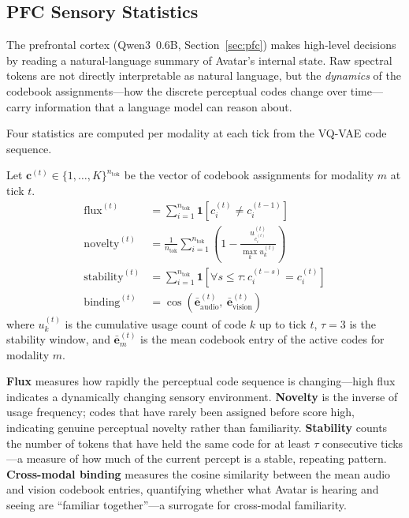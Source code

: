 \subsection{PFC Sensory Statistics}
\label{sec:pfc_stats}

The prefrontal cortex (Qwen3~0.6B, Section~\ref{sec:pfc}) makes high-level decisions
by reading a natural-language summary of Avatar's internal state.
Raw spectral tokens are not directly interpretable as natural language, but the
\emph{dynamics} of the codebook assignments---how the discrete perceptual codes
change over time---carry information that a language model can reason about.

Four statistics are computed per modality at each tick from the VQ-VAE code sequence.

\begin{definition}
Let $\mathbf{c}^{(t)} \in \{1, \ldots, K\}^{n_{\mathrm{tok}}}$ be the vector of
codebook assignments for modality $m$ at tick $t$.
\begin{align}
\mathrm{flux}^{(t)} &= \sum_{i=1}^{n_{\mathrm{tok}}} \mathbf{1}\!\left[c_i^{(t)} \neq c_i^{(t-1)}\right] \label{eq:flux} \\
\mathrm{novelty}^{(t)} &= \frac{1}{n_{\mathrm{tok}}} \sum_{i=1}^{n_{\mathrm{tok}}} \left(1 - \frac{u_{c_i^{(t)}}^{(t)}}{\max_k u_k^{(t)}}\right) \label{eq:novelty} \\
\mathrm{stability}^{(t)} &= \sum_{i=1}^{n_{\mathrm{tok}}} \mathbf{1}\!\left[\forall s \leq \tau : c_i^{(t-s)} = c_i^{(t)}\right] \label{eq:stability} \\
\mathrm{binding}^{(t)} &= \cos\!\left(\bar{\mathbf{e}}_{\mathrm{audio}}^{(t)},\ \bar{\mathbf{e}}_{\mathrm{vision}}^{(t)}\right) \label{eq:binding}
\end{align}
where $u_k^{(t)}$ is the cumulative usage count of code $k$ up to tick $t$,
$\tau = 3$ is the stability window, and $\bar{\mathbf{e}}_m^{(t)}$ is the mean
codebook entry of the active codes for modality $m$.
\end{definition}

\textbf{Flux} measures how rapidly the perceptual code sequence is changing---high flux
indicates a dynamically changing sensory environment.
\textbf{Novelty} is the inverse of usage frequency; codes that have rarely been
assigned before score high, indicating genuine perceptual novelty rather than
familiarity.
\textbf{Stability} counts the number of tokens that have held the same code for at
least $\tau$ consecutive ticks---a measure of how much of the current percept is
a stable, repeating pattern.
\textbf{Cross-modal binding} measures the cosine similarity between the mean audio and
vision codebook entries, quantifying whether what Avatar is hearing and seeing are
``familiar together''---a surrogate for cross-modal familiarity.

